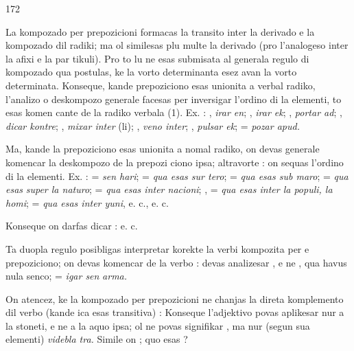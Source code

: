 \begin{VUpage}[176]{172}

\VUsaut{5.79mm}

La kompozado per prepozicioni formacas la transito inter\nl
la derivado e la kompozado dil radiki; ma ol similesas plu\nl
multe la derivado (pro l'analogeso inter la afixi e la par\cc
tikuli). Pro to lu ne esas submisata al generala regulo di\nl
kompozado qua postulas, ke la vorto determinanta esez avan\nl
la vorto determinata. Konseque, kande prepoziciono esas\nl
unionita a verbal radiko, l'analizo o deskompozo generale\nl
facesas per inversigar l'ordino di la elementi, to esas komen\cc
cante de la radiko verbala (1). Ex. : , \textit{irar en}; ,\nl
\textit{irar ek}; , \textit{portar ad}; , \textit{dicar kontre};\nl
{}, \textit{mixar inter} (li); , \textit{veno inter}; \cc
{}, \textit{pulsar ek};  = \textit{pozar apud.}

Ma, kande la prepoziciono esas unionita a nomal radiko,\nl
on devas generale komencar la deskompozo de la prepozi\cc
ciono ipsa; altravorte : on sequas l'ordino di la elementi.\nl
Ex. :  = \textit{sen hari};  = \textit{qua esas sur tero};\nl
{} = \textit{qua esas sub maro};  = \textit{qua esas}\nl
\textit{super la naturo};  = \textit{qua esas inter nacioni};\nl
{},  = \textit{qua esas inter la populi, la homi};\nl
{} = \textit{qua esas inter yuni}, e. c., e. c.

Konseque on darfas dicar : \cc
{} e. c.

Ta duopla regulo posibligas interpretar korekte la verbi\nl
kompozita per  e prepoziciono; on devas komencar de\nl
la verbo  :  devas analizesar , e ne\nl
{}, qua havus nula senco;  = \textit{igar sen}\cc
\textit{arma.}

On atencez, ke la kompozado per prepozicioni ne chanjas\nl
la direta komplemento dil verbo (kande ica esas transitiva) :\nl
{}\nl
{} Konseque l'adjektivo  povas\nl
aplikesar nur a la stoneti, e ne a la aquo ipsa; ol ne povas\nl
signifikar , ma nur (segun sua elementi) \textit{videbla tra.}\nl
Simile on ; quo esas ?\parplein
\end{VUpage}


